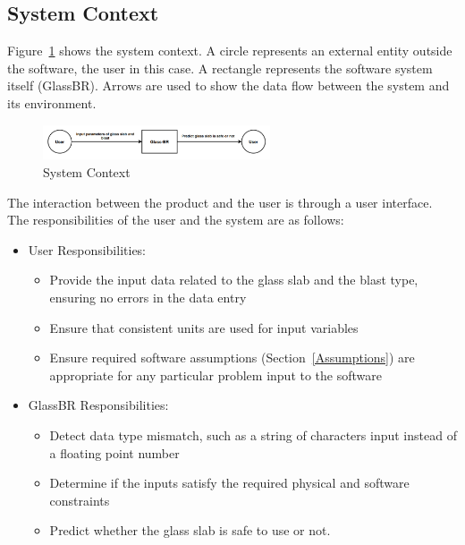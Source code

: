 \documentclass[12pt]{article}
\newcommand{\progname}{GlassBR}
\begin{document}
\subsection{System Context}

Figure~\ref{Fig_SystemContext} shows the system context.  A circle represents an
external entity outside the software, the user in this case.  A rectangle
represents the software system itself (\progname{}).  Arrows are used to show the data
flow between the system and its environment.

\begin{figure}[h!]
	\begin{center}
		\includegraphics[width=0.6\textwidth]{SystemContextFigure.png}
		\caption{System Context}
		\label{Fig_SystemContext} 
	\end{center}
\end{figure}

The interaction between the product and the user is through a user
interface.  The responsibilities of the user and the system are as follows:

\begin{itemize}
\item User Responsibilities:
  \begin{itemize}
  \item Provide the input data related to the glass slab and the blast type,
    ensuring no errors in the data entry
  \item Ensure that consistent units are used for input variables
  \item Ensure required software assumptions (Section~\ref{Assumptions}) are
    appropriate for any particular problem input to the software
  \end{itemize}
\item \progname{} Responsibilities:
  \begin{itemize}
  \item Detect data type mismatch, such as a string of characters input instead
    of a floating point number
  \item Determine if the inputs satisfy the required physical and software
    constraints
  \item Predict whether the glass slab is safe to use or not.
  \end{itemize}
\end{itemize}
\end{document}
